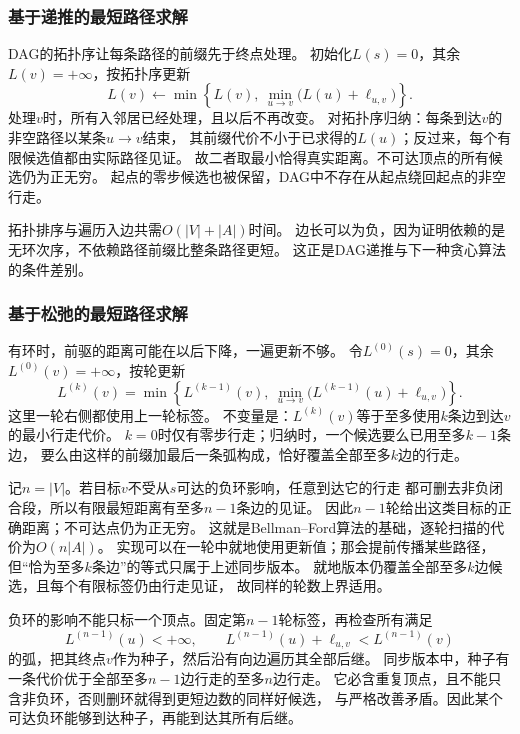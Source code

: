 \subsubsection{基于递推的最短路径求解}

DAG的拓扑序让每条路径的前缀先于终点处理。
初始化\(L(s)=0\)，其余\(L(v)=+\infty\)，按拓扑序更新
\[
  L(v)\leftarrow
  \min\left\{L(v),\ \min_{u\to v}\bigl(L(u)+\ell_{u,v}\bigr)\right\}.
\]
处理\(v\)时，所有入邻居已经处理，且以后不再改变。
对拓扑序归纳：每条到达\(v\)的非空路径以某条\(u\to v\)结束，
其前缀代价不小于已求得的\(L(u)\)；反过来，每个有限候选值都由实际路径见证。
故二者取最小恰得真实距离。不可达顶点的所有候选仍为正无穷。
起点的零步候选也被保留，DAG中不存在从起点绕回起点的非空行走。

拓扑排序与遍历入边共需\(O(|V|+|A|)\)时间。
边长可以为负，因为证明依赖的是无环次序，不依赖路径前缀比整条路径更短。
这正是DAG递推与下一种贪心算法的条件差别。

\subsubsection{基于松弛的最短路径求解}

有环时，前驱的距离可能在以后下降，一遍更新不够。
令\(L^{(0)}(s)=0\)，其余\(L^{(0)}(v)=+\infty\)，按轮更新
\[
  L^{(k)}(v)=
  \min\left\{
    L^{(k-1)}(v),\
    \min_{u\to v}\bigl(L^{(k-1)}(u)+\ell_{u,v}\bigr)
  \right\}.
\]
这里一轮右侧都使用上一轮标签。
不变量是：\(L^{(k)}(v)\)等于至多使用\(k\)条边到达\(v\)的最小行走代价。
\(k=0\)时仅有零步行走；归纳时，一个候选要么已用至多\(k-1\)条边，
要么由这样的前缀加最后一条弧构成，恰好覆盖全部至多\(k\)边的行走。

记\(n=|V|\)。若目标\(v\)不受从\(s\)可达的负环影响，任意到达它的行走
都可删去非负闭合段，所以有限最短距离有至多\(n-1\)条边的见证。
因此\(n-1\)轮给出这类目标的正确距离；不可达点仍为正无穷。
这就是Bellman--Ford算法的基础，逐轮扫描的代价为\(O(n|A|)\)。
实现可以在一轮中就地使用更新值；那会提前传播某些路径，
但“恰为至多\(k\)条边”的等式只属于上述同步版本。
就地版本仍覆盖全部至多\(k\)边候选，且每个有限标签仍由行走见证，
故同样的轮数上界适用。

负环的影响不能只标一个顶点。固定第\(n-1\)轮标签，再检查所有满足
\[
  L^{(n-1)}(u)<+\infty,\qquad
  L^{(n-1)}(u)+\ell_{u,v}<L^{(n-1)}(v)
\]
的弧，把其终点\(v\)作为种子，然后沿有向边遍历其全部后继。
同步版本中，种子有一条代价优于全部至多\(n-1\)边行走的至多\(n\)边行走。
它必含重复顶点，且不能只含非负环，否则删环就得到更短边数的同样好候选，
与严格改善矛盾。因此某个可达负环能够到达种子，再能到达其所有后继。

